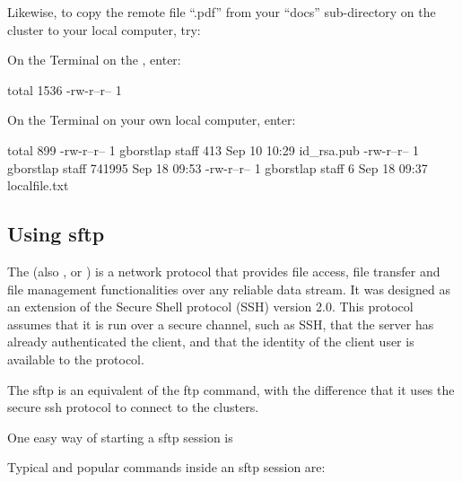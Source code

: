   Likewise, to copy the remote file ``\jobname.pdf'' from your ``docs''
  sub-directory on the cluster to your local computer, try:

  On the Terminal on the \hpc, enter:

  \begin{prompt}
  total 1536
  -rw-r--r-- 1 %
  \end{prompt}

  On the Terminal on your own local computer, enter:

  \begin{prompt}
  total  899
  -rw-r--r--   1 gborstlap  staff     413 Sep 10 10:29 id_rsa.pub
  -rw-r--r--   1 gborstlap  staff  741995 Sep 18 09:53 %
  -rw-r--r--   1 gborstlap  staff       6 Sep 18 09:37 localfile.txt
  \end{prompt}

  \subsection{Using sftp}

  The  (also , or ) is a network protocol that provides file access,
  file transfer and file management functionalities over any reliable data
  stream. It was designed as an extension of the Secure Shell protocol (SSH)
  version 2.0. This protocol assumes that it is run over a secure channel, such
  as SSH, that the server has already authenticated the client, and that the
  identity of the client user is available to the protocol.

  The sftp is an equivalent of the ftp command, with the difference that it uses
  the secure ssh protocol to connect to the clusters.

  One easy way of starting a sftp session is
  \begin{prompt}
  \end{prompt}

  Typical and popular commands inside an sftp session are:

